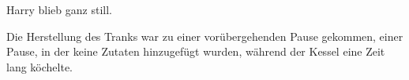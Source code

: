 Harry blieb ganz still.

Die Herstellung des Tranks war zu einer vorübergehenden Pause gekommen, einer Pause, in der keine Zutaten hinzugefügt wurden, während der Kessel eine Zeit lang köchelte.
